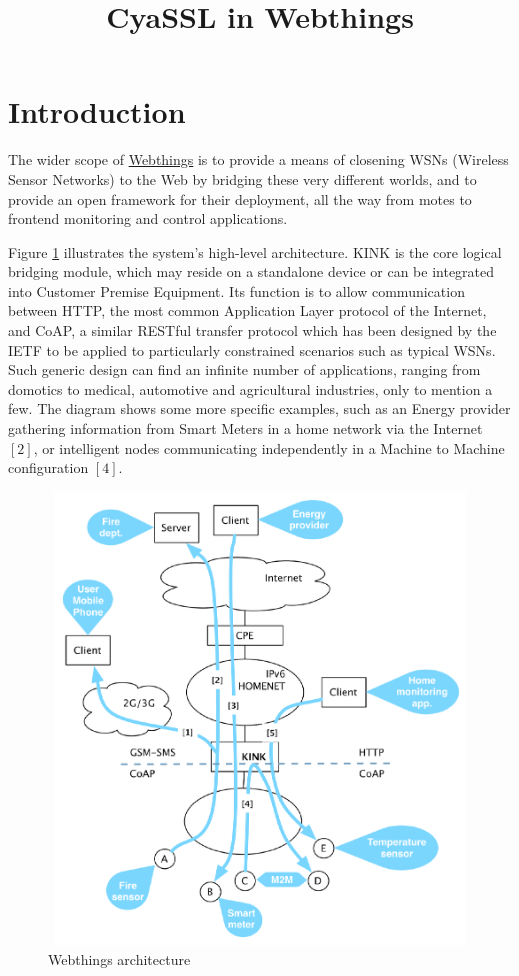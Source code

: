 \documentclass[10pt]{article}
\title{\textbf{CyaSSL in Webthings}}
\author{}
\date{}
\begin{document}
\maketitle

\section{Introduction}

The wider scope of \href{http://github.com/koanlogic/webthings}{Webthings} is to provide a means of closening WSNs (Wireless Sensor Networks) to the Web by bridging these very different worlds, and to provide an open framework for their deployment, all the way from motes to frontend monitoring and control applications.

Figure \ref{fig:arch} illustrates the system's high-level architecture. KINK is the core logical bridging module, which may reside on a standalone device or can be integrated into Customer Premise Equipment. Its function is to allow communication between HTTP, the most common Application Layer protocol of the Internet, and CoAP, a similar RESTful transfer protocol which has been designed by the IETF to be applied to particularly constrained scenarios such as typical WSNs. Such generic design can find an infinite number of applications, ranging from domotics to medical, automotive and agricultural industries, only to mention a few. The diagram shows some more specific examples, such as an Energy provider gathering information from Smart Meters in a home network via the Internet $[2]$, or intelligent nodes communicating independently in a Machine to Machine configuration $[4]$.

\begin{figure}
  \centering
  \includegraphics[width=12cm,height=12cm]{../share/images/kink-homenet}
    \caption{Webthings architecture}
    \label{fig:arch}
\end{figure}
\end{document}
